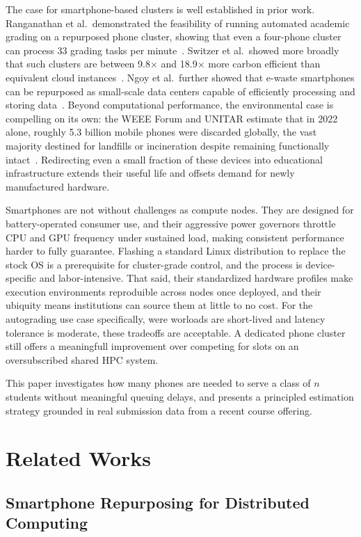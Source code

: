 \documentclass[acmlarge]{acmart}
\begin{document}
The case for smartphone-based clusters is well established in prior work. Ranganathan et al.\ demonstrated the feasibility of running automated academic grading on a repurposed phone cluster, showing that even a four-phone cluster can process 33 grading tasks per minute~\cite{ranganathan2025junkyard}. Switzer et al.\ showed more broadly that such clusters are between 9.8$\times$ and 18.9$\times$ more carbon efficient than equivalent cloud instances~\cite{10.1145/3575693.3575710}. Ngoy et al.\ further showed that e-waste smartphones can be repurposed as small-scale data centers capable of efficiently processing and storing data~\cite{ngoy2025ewaste}. Beyond computational performance, the environmental case is compelling on its own: the WEEE Forum and UNITAR estimate that in 2022 alone, roughly 5.3 billion mobile phones were discarded globally, the vast majority destined for landfills or incineration despite remaining functionally intact~\cite{weeeforum2022}. Redirecting even a small fraction of these devices into educational infrastructure extends their useful life and offsets demand for newly manufactured hardware.

Smartphones are not without challenges as compute nodes. They are designed for battery-operated consumer use, and their aggressive power governors throttle CPU and GPU frequency under sustained load, making consistent performance harder to fully guarantee. Flashing a standard Linux distribution to replace the stock OS is a prerequisite for cluster-grade control, and the process is device-specific and labor-intensive. That said, their standardized hardware profiles make execution environments reproduible across nodes once deployed, and their ubiquity means institutions can source them at little to no cost. For the autograding use case specifically, were worloads are short-lived and latency tolerance is moderate, these tradeoffs are acceptable. A dedicated phone cluster still offers a meaningfull improvement over competing for slots on an oversubscribed shared HPC system.

This paper investigates how many phones are needed to serve a class of $n$ students without meaningful queuing delays, and presents a principled estimation strategy grounded in real submission data from a recent course offering.

\section{Related Works}
 
\subsection{Smartphone Repurposing for Distributed Computing}
 
\end{document}
